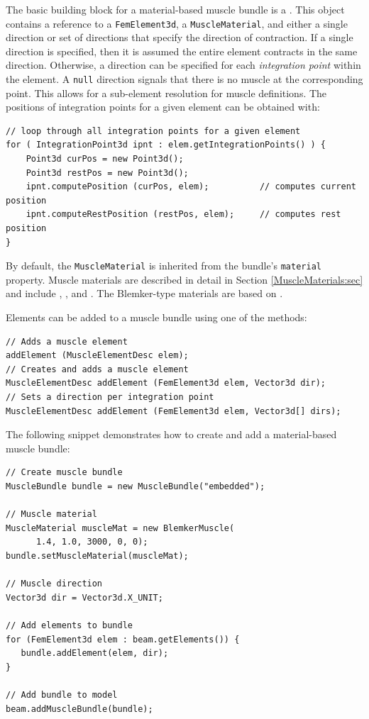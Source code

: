 The basic building block for a material-based muscle bundle is a 
.  This object contains
a reference to a {\tt FemElement3d}, a {\tt MuscleMaterial}, and either a
single direction or set of directions that specify the direction of 
contraction.  If a single direction is specified, then it is assumed the
entire element contracts in the same direction.  Otherwise, a direction
can be specified for each \emph{integration point} within the element.  A
{\tt null} direction signals that there is no muscle at the corresponding
point.  This allows for a sub-element resolution for muscle definitions. The 
positions of integration points for a given element can be obtained with:
\begin{lstlisting}[]
// loop through all integration points for a given element
for ( IntegrationPoint3d ipnt : elem.getIntegrationPoints() ) {
	Point3d curPos = new Point3d();
	Point3d restPos = new Point3d();
	ipnt.computePosition (curPos, elem);          // computes current position
	ipnt.computeRestPosition (restPos, elem);     // computes rest position
}
\end{lstlisting} 
By default, the {\tt MuscleMaterial} is inherited from the bundle's 
{\tt material} property.  Muscle materials are described
in detail in Section \ref{MuscleMaterials:sec} and
include 
, 
, and 
.  The Blemker-type
materials are based on \cite{blemker:2005:muscle}.

Elements can be added to a muscle bundle using one of the methods:
\begin{lstlisting}[]
// Adds a muscle element
addElement (MuscleElementDesc elem);          
// Creates and adds a muscle element
MuscleElementDesc addElement (FemElement3d elem, Vector3d dir);     
// Sets a direction per integration point
MuscleElementDesc addElement (FemElement3d elem, Vector3d[] dirs);  
\end{lstlisting}

The following snippet demonstrates how to create and add a material-based
muscle bundle:
\lstset{numbers=left}
\begin{lstlisting}[]
// Create muscle bundle
MuscleBundle bundle = new MuscleBundle("embedded");

// Muscle material
MuscleMaterial muscleMat = new BlemkerMuscle(
      1.4, 1.0, 3000, 0, 0);
bundle.setMuscleMaterial(muscleMat); 

// Muscle direction
Vector3d dir = Vector3d.X_UNIT;

// Add elements to bundle
for (FemElement3d elem : beam.getElements()) {
   bundle.addElement(elem, dir);
}

// Add bundle to model      
beam.addMuscleBundle(bundle);
\end{lstlisting}
\lstset{numbers=none}

